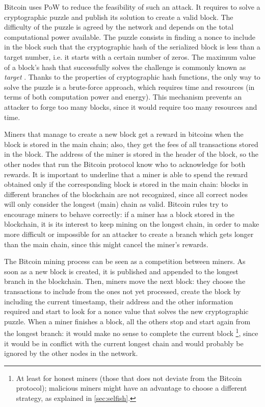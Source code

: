 \medskip
Bitcoin uses \ac{PoW} \cite{pow_2002} to reduce the feasibility of such an attack.
It requires to solve a cryptographic puzzle and publish its solution to create a valid block.
The difficulty of the puzzle is agreed by the network and depends on the total computational power available.
The puzzle consists in finding a nonce to include in the block such that the cryptographic hash of the serialized block is less than a target number, i.e. it starts with a certain number of zeros.
The maximum value of a block's hash that successfully solves the challenge is commonly known as \textit{target} \cite{target}.
Thanks to the properties of cryptographic hash functions, the only way to solve the puzzle is a brute-force approach, which requires time and resources (in terms of both computation power and energy).
This mechanism prevents an attacker to forge too many blocks, since it would require too many resources and time.

\medskip
Miners that manage to create a new block get a reward in bitcoins when the block is stored in the main chain;
also, they get the fees of all transactions stored in the block.
The address of the miner is stored in the header of the block, so the other nodes that run the Bitcoin protocol know who to acknowledge for both rewards.
It is important to underline that a miner is able to spend the reward obtained only if the corresponding block is stored in the main chain:
blocks in different branches of the blockchain are not recognized, since all correct nodes will only consider the longest (main) chain as valid.
Bitcoin rules try to encourage miners to behave correctly:
if a miner has a block stored in the blockchain, it is its interest to keep mining on the longest chain, in order to make more difficult or impossible for an attacker to create a branch which gets longer than the main chain, since this might cancel the miner's rewards.

\medskip
The Bitcoin mining process can be seen as a competition between miners.
As soon as a new block is created, it is published and appended to the longest branch in the blockchain.
Then, miners move the next block:
they choose the transactions to include from the ones not yet processed, create the block by including the current timestamp, their address and the other information required and start to look for a nonce value that solves the new cryptographic puzzle.
When a miner finishes a block, all the others stop and start again from the longest branch:
it would make no sense to complete the current block \footnote{At least for honest miners (those that does not deviate from the Bitcoin protocol); malicious miners might have an advantage to choose a different strategy, as explained in \cref{sec:selfish}.}, since it would be in conflict with the current longest chain and would probably be ignored by the other nodes in the network.

